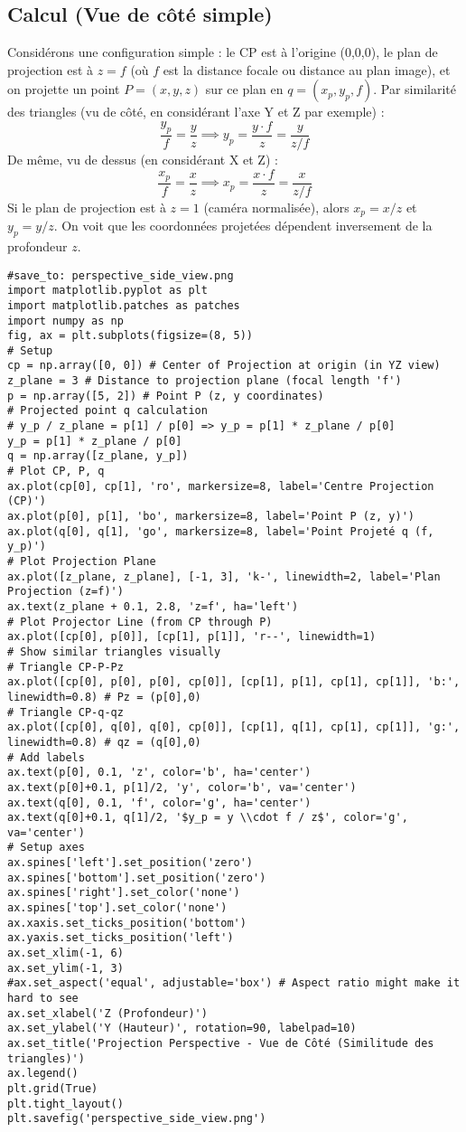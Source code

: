 \subsection{Calcul (Vue de côté simple)}
Considérons une configuration simple : le CP est à l'origine (0,0,0), le plan de projection est à \( z = f \) (où \( f \) est la distance focale ou distance au plan image), et on projette un point \( P = (x, y, z) \) sur ce plan en \( q = (x_p, y_p, f) \).
Par similarité des triangles (vu de côté, en considérant l'axe Y et Z par exemple) :
\[ \frac{y_p}{f} = \frac{y}{z} \implies y_p = \frac{y \cdot f}{z} = \frac{y}{z/f} \]
De même, vu de dessus (en considérant X et Z) :
\[ \frac{x_p}{f} = \frac{x}{z} \implies x_p = \frac{x \cdot f}{z} = \frac{x}{z/f} \]
Si le plan de projection est à \( z=1 \) (caméra normalisée), alors \( x_p = x/z \) et \( y_p = y/z \).
On voit que les coordonnées projetées dépendent inversement de la profondeur \( z \).
\begin{verbatim}
#save_to: perspective_side_view.png
import matplotlib.pyplot as plt
import matplotlib.patches as patches
import numpy as np
fig, ax = plt.subplots(figsize=(8, 5))
# Setup
cp = np.array([0, 0]) # Center of Projection at origin (in YZ view)
z_plane = 3 # Distance to projection plane (focal length 'f')
p = np.array([5, 2]) # Point P (z, y coordinates)
# Projected point q calculation
# y_p / z_plane = p[1] / p[0] => y_p = p[1] * z_plane / p[0]
y_p = p[1] * z_plane / p[0]
q = np.array([z_plane, y_p])
# Plot CP, P, q
ax.plot(cp[0], cp[1], 'ro', markersize=8, label='Centre Projection (CP)')
ax.plot(p[0], p[1], 'bo', markersize=8, label='Point P (z, y)')
ax.plot(q[0], q[1], 'go', markersize=8, label='Point Projeté q (f, y_p)')
# Plot Projection Plane
ax.plot([z_plane, z_plane], [-1, 3], 'k-', linewidth=2, label='Plan Projection (z=f)')
ax.text(z_plane + 0.1, 2.8, 'z=f', ha='left')
# Plot Projector Line (from CP through P)
ax.plot([cp[0], p[0]], [cp[1], p[1]], 'r--', linewidth=1)
# Show similar triangles visually
# Triangle CP-P-Pz
ax.plot([cp[0], p[0], p[0], cp[0]], [cp[1], p[1], cp[1], cp[1]], 'b:', linewidth=0.8) # Pz = (p[0],0)
# Triangle CP-q-qz
ax.plot([cp[0], q[0], q[0], cp[0]], [cp[1], q[1], cp[1], cp[1]], 'g:', linewidth=0.8) # qz = (q[0],0)
# Add labels
ax.text(p[0], 0.1, 'z', color='b', ha='center')
ax.text(p[0]+0.1, p[1]/2, 'y', color='b', va='center')
ax.text(q[0], 0.1, 'f', color='g', ha='center')
ax.text(q[0]+0.1, q[1]/2, '$y_p = y \\cdot f / z$', color='g', va='center')
# Setup axes
ax.spines['left'].set_position('zero')
ax.spines['bottom'].set_position('zero')
ax.spines['right'].set_color('none')
ax.spines['top'].set_color('none')
ax.xaxis.set_ticks_position('bottom')
ax.yaxis.set_ticks_position('left')
ax.set_xlim(-1, 6)
ax.set_ylim(-1, 3)
#ax.set_aspect('equal', adjustable='box') # Aspect ratio might make it hard to see
ax.set_xlabel('Z (Profondeur)')
ax.set_ylabel('Y (Hauteur)', rotation=90, labelpad=10)
ax.set_title('Projection Perspective - Vue de Côté (Similitude des triangles)')
ax.legend()
plt.grid(True)
plt.tight_layout()
plt.savefig('perspective_side_view.png')
\end{verbatim}

